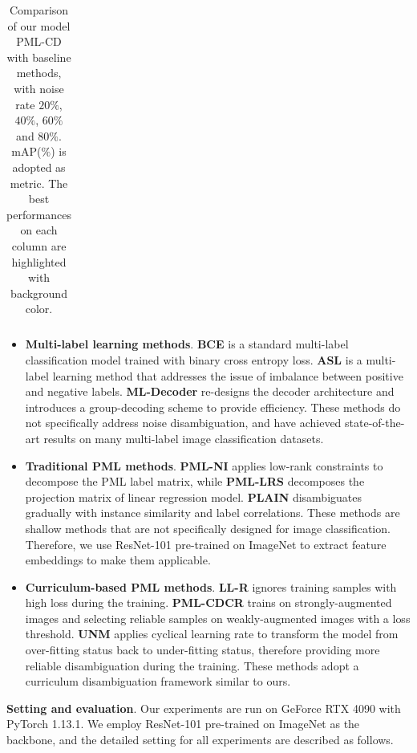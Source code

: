 \documentclass[letterpaper]{article} %
\begin{document}
\begin{table}[tb]
\begin{tabular}{lcccccccccccccccc}
    \bottomrule
    \end{tabular}%
    \caption{Comparison of our model PML-CD with baseline methods, with noise rate $20\%$, $40\%$, $60\%$ and $80\%$. mAP($\%$) is adopted as metric. The best performances on each column are highlighted with background color. }
    \label{tab:main-result}%
  \end{table}

  \begin{itemize}

    \item \textbf{Multi-label learning methods}. \textbf{BCE} is a standard multi-label classification model trained with binary cross entropy loss. \textbf{ASL} \cite{ASL} is a multi-label learning method that addresses the issue of imbalance between positive and negative labels. \textbf{ML-Decoder} \cite{ML-Decoder} re-designs the decoder architecture and introduces a group-decoding scheme to provide efficiency. These methods do not specifically address noise disambiguation, and have achieved state-of-the-art results on many multi-label image classification datasets.

    \item \textbf{Traditional PML methods}. \textbf{PML-NI} \cite{PML-NI} applies low-rank constraints to decompose the PML label matrix, while \textbf{PML-LRS} \cite{PML-LRS} decomposes the projection matrix of linear regression model. \textbf{PLAIN} \cite{PLAIN} disambiguates gradually with instance similarity and label correlations. These methods are shallow methods that are not specifically designed for image classification. Therefore, we use ResNet-101 \cite{ResNet} pre-trained on ImageNet to extract feature embeddings to make them applicable.

    \item \textbf{Curriculum-based PML methods}. \textbf{LL-R} \cite{LL-R} ignores training samples with high loss during the training. \textbf{PML-CDCR} \cite{PML-CDCR} trains on strongly-augmented images and selecting reliable samples on weakly-augmented images with a loss threshold. \textbf{UNM} \cite{UNM} applies cyclical learning rate to transform the model from over-fitting status back to under-fitting status, therefore providing more reliable disambiguation during the training. These methods adopt a curriculum disambiguation framework similar to ours.

  \end{itemize}

  \textbf{Setting and evaluation}. Our experiments are run on GeForce RTX 4090 with PyTorch 1.13.1. We employ ResNet-101 \cite{ResNet} pre-trained on ImageNet as the backbone, and the detailed setting for all experiments are described as follows. 
\end{document}
